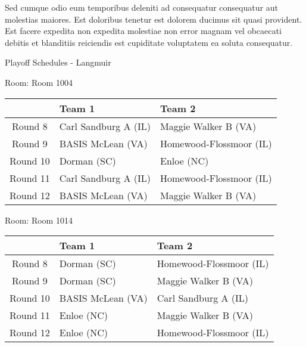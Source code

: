 \documentclass{article}%
\begin{document}
\newline%
Sed cumque odio eum temporibus deleniti ad consequatur consequatur aut molestias maiores. Est doloribus tenetur est dolorem ducimus sit quasi provident. Est facere expedita non expedita molestiae non error magnam vel obcaecati debitis et blanditiis reiciendis est cupiditate voluptatem ea soluta consequatur.%
\newpage%
\begin{center}%
\begin{Huge}%
Playoff Schedules {-} Langmuir%
\end{Huge}%
\end{center}%
\begin{flushleft}%
\begin{Large}%
Room: Room 1004%
\end{Large}%
\end{flushleft}%
\begin{tabularx}{\textwidth}{|c|Y|Y|}%
\hline%
&Team 1&Team 2\\%
\hline%
Round 8&Carl Sandburg A (IL)&Maggie Walker B (VA)\\%
Round 9&BASIS McLean (VA)&Homewood{-}Flossmoor (IL)\\%
Round 10&Dorman (SC)&Enloe (NC)\\%
Round 11&Carl Sandburg A (IL)&Homewood{-}Flossmoor (IL)\\%
Round 12&BASIS McLean (VA)&Maggie Walker B (VA)\\%
\hline%
\end{tabularx}%
\vspace*{8pt}%
\linebreak%
\begin{flushleft}%
\begin{Large}%
Room: Room 1014%
\end{Large}%
\end{flushleft}%
\begin{tabularx}{\textwidth}{|c|Y|Y|}%
\hline%
&Team 1&Team 2\\%
\hline%
Round 8&Dorman (SC)&Homewood{-}Flossmoor (IL)\\%
Round 9&Dorman (SC)&Maggie Walker B (VA)\\%
Round 10&BASIS McLean (VA)&Carl Sandburg A (IL)\\%
Round 11&Enloe (NC)&Maggie Walker B (VA)\\%
Round 12&Enloe (NC)&Homewood{-}Flossmoor (IL)\\%
\hline%
\end{tabularx}%
\vspace*{8pt}%
\end{document}

